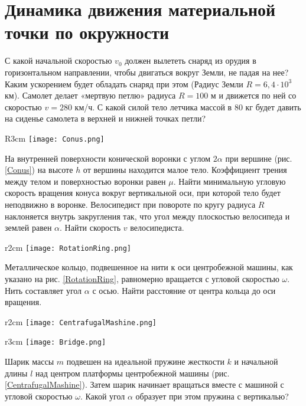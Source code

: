\section{Динамика движения материальной точки по окружности}
\AddProb С какой начальной скоростью $v_0$ должен вылететь снаряд из
орудия в горизонтальном направлении, чтобы двигаться вокруг Земли, не падая на нее? Каким ускорением будет обладать снаряд при этом (Радиус Земли $R = 6,4 \cdot 10^3$ км).
\AddProb Самолет делает «мертвую петлю» радиуса $R = 100$ м и движется по ней со скоростью $v = 280$ км/ч. С какой силой тело летчика массой в 80 кг будет давить на сиденье самолета в верхней и нижней точках петли?

\begin{wrapfigure}[11]{R}{3cm}
\texttt{[image: Conus.png]}
\caption{}
\label{Conus}
\end{wrapfigure}
\AddProb На внутренней поверхности конической воронки с углом $2\alpha$ при вершине (рис. \ref{Conus}) на высоте $h$ от вершины находится малое тело. Коэффициент трения между телом и поверхностью воронки равен $\mu$. Найти минимальную угловую скорость вращения конуса вокруг вертикальной оси, при которой тело будет неподвижно в воронке.
\AddProb Велосипедист при повороте по кругу радиуса $R$ наклоняется внутрь закругления так, что угол между плоскостью велосипеда и землей равен $\alpha$. Найти скорость $v$ велосипедиста.

\begin{wrapfigure}[10]{r}{2cm}
\texttt{[image: RotationRing.png]}
\caption{}
\label{RotationRing}
\end{wrapfigure}
\AddProb Металлическое кольцо, подвешенное на нити к оси центробежной машины, как указано на рис. \ref{RotationRing}, равномерно вращается с угловой скоростью $\omega$. Нить составляет
угол $\alpha$ с осью. Найти расстояние от центра кольца до оси вращения.

\begin{wrapfigure}[5]{r}{2cm}
\texttt{[image: CentrafugalMashine.png]}
\caption{}
\label{CentrafugalMashine}
\end{wrapfigure}
\begin{wrapfigure}[9]{r}{3cm}
\texttt{[image: Bridge.png]}
\caption{}
\label{Bridge}
\end{wrapfigure}
\AddProb Шарик массы $m$ подвешен на идеальной пружине жесткости $	k$ и начальной длины $l$ над центром платформы центробежной
машины (рис. \ref{CentrafugalMashine}). Затем шарик начинает вращаться вместе с машиной с угловой скоростью $\omega$. Какой
угол $\alpha$ образует при этом пружина с вертикалью?

